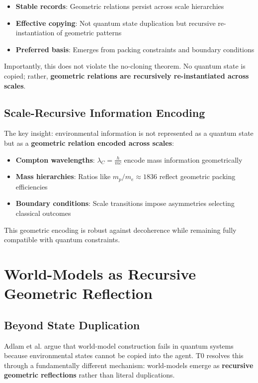 	\begin{itemize}
		\item \textbf{Stable records}: Geometric relations persist across scale hierarchies
		\item \textbf{Effective copying}: Not quantum state duplication but recursive re-instantiation of geometric patterns
		\item \textbf{Preferred basis}: Emerges from packing constraints and boundary conditions
	\end{itemize}
	
	Importantly, this does not violate the no-cloning theorem. No quantum state is copied; rather, \textbf{geometric relations are recursively re-instantiated across scales}.
	
	\subsection{Scale-Recursive Information Encoding}
	
	The key insight: environmental information is not represented as a quantum state but as a \textbf{geometric relation encoded across scales}:
	
	\begin{itemize}
		\item \textbf{Compton wavelengths}: $\lambda_C = \frac{h}{mc}$ encode mass information geometrically
		\item \textbf{Mass hierarchies}: Ratios like $m_p/m_e \approx 1836$ reflect geometric packing efficiencies
		\item \textbf{Boundary conditions}: Scale transitions impose asymmetries selecting classical outcomes
	\end{itemize}
	
	This geometric encoding is robust against decoherence while remaining fully compatible with quantum constraints.
	
	\section{World-Models as Recursive Geometric Reflection}
	
	\subsection{Beyond State Duplication}
	
	Adlam et al. argue that world-model construction fails in quantum systems because environmental states cannot be copied into the agent. T0 resolves this through a fundamentally different mechanism: world-models emerge as \textbf{recursive geometric reflections} rather than literal duplications.
	
